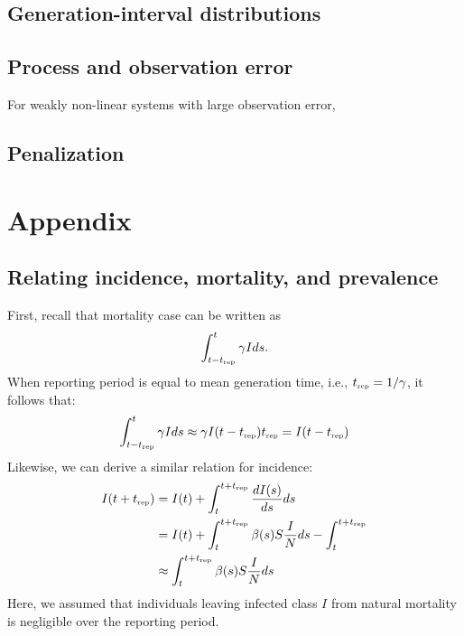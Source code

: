 \documentclass{article}
\newcommand{\tsub}[2]{#1_{{\textrm{\tiny #2}}}}
\begin{document}
\subsection{Generation-interval distributions}


\subsection{Process and observation error}

For weakly non-linear systems with large observation error, 


\subsection{Penalization}



\section{Appendix}

\subsection{Relating incidence, mortality, and prevalence}

First, recall that mortality case can be written as
\begin{equation}
\int_{t-\tsub{t}{rep}}^{t} \gamma I ds.
\end{equation}
When reporting period is equal to mean generation time, i.e., $\tsub{t}{rep} = 1/\gamma$, 
it follows that:
\begin{equation}
\int_{t-\tsub{t}{rep}}^{t} \gamma I ds \approx \gamma I(t-\tsub{t}{rep}) \tsub{t}{rep} = I(t-\tsub{t}{rep})
\end{equation}
Likewise, we can derive a similar relation for incidence:
\begin{equation}
\begin{aligned}
I(t+\tsub{t}{rep}) &= I(t) + \int_{t}^{t+\tsub{t}{rep}} \frac{dI(s)}{ds} ds\\
&= I(t) + \int_{t}^{t+\tsub{t}{rep}} \beta(s) S \frac{I}{N} ds - \int_{t}^{t+\tsub{t}{rep}}\\
&\approx \int_{t}^{t+\tsub{t}{rep}} \beta(s) S \frac{I}{N} ds
\end{aligned}
\end{equation}
Here, we assumed that individuals leaving infected class $I$ from natural mortality is negligible over the reporting period.
\end{document}
